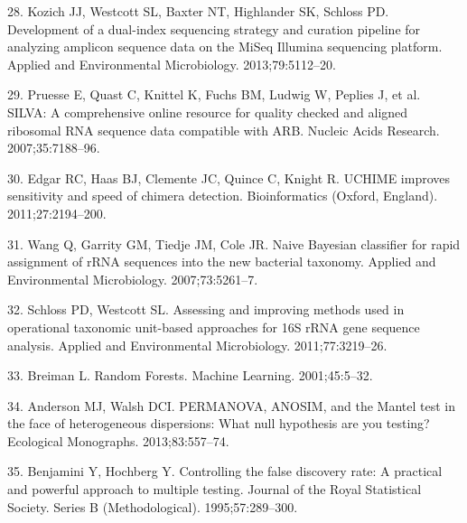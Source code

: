 \documentclass[12pt,]{article}
\begin{document}
\hypertarget{ref-kozich_development_2013}{}
28. Kozich JJ, Westcott SL, Baxter NT, Highlander SK, Schloss PD.
Development of a dual-index sequencing strategy and curation pipeline
for analyzing amplicon sequence data on the MiSeq Illumina sequencing
platform. Applied and Environmental Microbiology. 2013;79:5112--20.

\hypertarget{ref-pruesse_silva_2007}{}
29. Pruesse E, Quast C, Knittel K, Fuchs BM, Ludwig W, Peplies J, et al.
SILVA: A comprehensive online resource for quality checked and aligned
ribosomal RNA sequence data compatible with ARB. Nucleic Acids Research.
2007;35:7188--96.

\hypertarget{ref-edgar_uchime_2011}{}
30. Edgar RC, Haas BJ, Clemente JC, Quince C, Knight R. UCHIME improves
sensitivity and speed of chimera detection. Bioinformatics (Oxford,
England). 2011;27:2194--200.

\hypertarget{ref-wang_naive_2007}{}
31. Wang Q, Garrity GM, Tiedje JM, Cole JR. Naive Bayesian classifier
for rapid assignment of rRNA sequences into the new bacterial taxonomy.
Applied and Environmental Microbiology. 2007;73:5261--7.

\hypertarget{ref-schloss_assessing_2011}{}
32. Schloss PD, Westcott SL. Assessing and improving methods used in
operational taxonomic unit-based approaches for 16S rRNA gene sequence
analysis. Applied and Environmental Microbiology. 2011;77:3219--26.

\hypertarget{ref-breiman_random_2001}{}
33. Breiman L. Random Forests. Machine Learning. 2001;45:5--32.

\hypertarget{ref-anderson_permanova_2013}{}
34. Anderson MJ, Walsh DCI. PERMANOVA, ANOSIM, and the Mantel test in
the face of heterogeneous dispersions: What null hypothesis are you
testing? Ecological Monographs. 2013;83:557--74.

\hypertarget{ref-benjamini_controlling_1995}{}
35. Benjamini Y, Hochberg Y. Controlling the false discovery rate: A
practical and powerful approach to multiple testing. Journal of the
Royal Statistical Society. Series B (Methodological). 1995;57:289--300.
\end{document}
